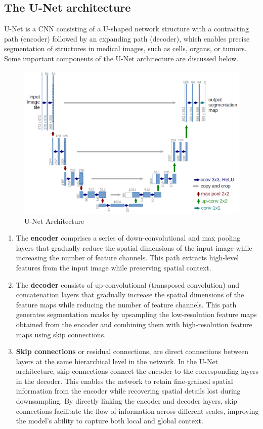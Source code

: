 \subsection{The U-Net architecture}
U-Net is a CNN consisting of a U-shaped network structure with a contracting path (encoder) followed by an expanding path (decoder), which enables precise segmentation of structures in medical images, such as cells, organs, or tumors. Some important components of the U-Net architecture are discussed below. 
\begin{figure}[ht]
    \centering
    \includegraphics[width=12cm]{images/Theory-DL/UNet.png}
    \caption{U-Net Architecture}
    \label{fig:UNet}
\end{figure}
\begin{enumerate}
  \item The \textbf{encoder} comprises a series of down-convolutional and max pooling layers that gradually reduce the spatial dimensions of the input image while increasing the number of feature channels. This path extracts high-level features from the input image while preserving spatial context.
  \item The \textbf{decoder} consists of up-convolutional (transposed convolution) and concatenation layers that gradually increase the spatial dimensions of the feature maps while reducing the number of feature channels. This path generates segmentation masks by upsampling the low-resolution feature maps obtained from the encoder and combining them with high-resolution feature maps using skip connections.
  \item \textbf{Skip connections} or residual connections, are direct connections between layers at the same hierarchical level in the network. In the U-Net architecture, skip connections connect the encoder to the corresponding layers in the decoder. This enables the network to retain fine-grained spatial information from the encoder while recovering spatial details lost during downsampling. By directly linking the encoder and decoder layers, skip connections facilitate the flow of information across different scales, improving the model's ability to capture both local and global context.
\end{enumerate}
